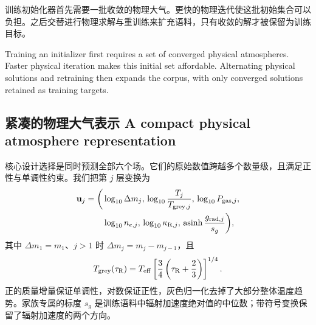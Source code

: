 训练初始化器首先需要一批收敛的物理大气。更快的物理迭代使这批初始集合可以负担。之后交替进行物理求解与重训练来扩充语料，只有收敛的解才被保留为训练目标。

\begin{EN}
Training an initializer first requires a set of converged physical atmospheres.
Faster physical iteration makes this initial set affordable. Alternating
physical solutions and retraining then expands the corpus, with only converged
solutions retained as training targets.
\end{EN}

\subsection{紧凑的物理大气表示 A compact physical atmosphere representation}

核心设计选择是同时预测全部六个场。它们的原始数值跨越多个数量级，且满足正性与单调性约束。我们把第 $j$ 层变换为
\begin{equation}
\begin{aligned}
\mathbf{u}_j=\bigg(&
\log_{10}\Delta m_j,\,
\log_{10}\frac{T_j}{T_{{\rm grey},j}},\,
\log_{10}P_{{\rm gas},j},\\
&\log_{10}n_{e,j},\,
\log_{10}\kappa_{{\rm R},j},\,
\operatorname{asinh}\frac{g_{{\rm rad},j}}{s_g}
\bigg),
\end{aligned}
\end{equation}
\noindent 其中 $\Delta m_1=m_1$、$j>1$ 时 $\Delta m_j=m_j-m_{j-1}$，且
\begin{equation}
T_{\rm grey}(\tau_{\rm R})=
T_{\rm eff}
\left[\frac{3}{4}\left(\tau_{\rm R}+\frac{2}{3}\right)\right]^{1/4}.
\end{equation}
\noindent 正的质量增量保证单调性，对数保证正性，灰色归一化去掉了大部分整体温度趋势。家族专属的标度 $s_g$ 是训练语料中辐射加速度绝对值的中位数；带符号变换保留了辐射加速度的两个方向。

